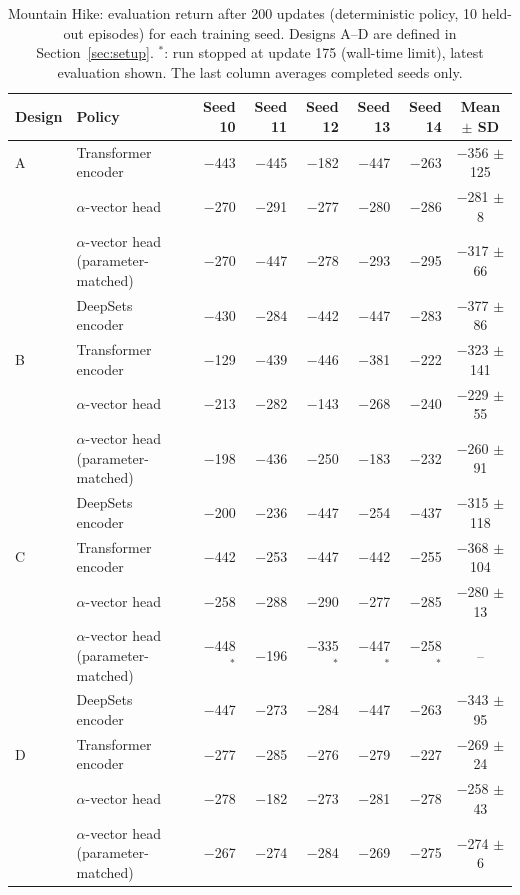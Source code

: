 \documentclass[11pt]{article}
\begin{document}
\begin{table}[htbp]
\centering
\footnotesize
\caption{Mountain Hike: evaluation return after 200 updates (deterministic policy, 10 held-out episodes) for each training seed. Designs A--D are defined in Section~\ref{sec:setup}. $^{*}$: run stopped at update 175 (wall-time limit), latest evaluation shown. The last column averages completed seeds only.}
\label{tab:mh-final}
\begin{tabular}{llrrrrrc}
\toprule
Design & Policy & Seed 10 & Seed 11 & Seed 12 & Seed 13 & Seed 14 & Mean $\pm$ SD \\
\midrule
A & Transformer encoder & $-$443 & $-$445 & $-$182 & $-$447 & $-$263 & $-$356 $\pm$ 125 \\
 & $\alpha$-vector head & $-$270 & $-$291 & $-$277 & $-$280 & $-$286 & $-$281 $\pm$ 8 \\
 & $\alpha$-vector head (parameter-matched) & $-$270 & $-$447 & $-$278 & $-$293 & $-$295 & $-$317 $\pm$ 66 \\
 & DeepSets encoder & $-$430 & $-$284 & $-$442 & $-$447 & $-$283 & $-$377 $\pm$ 86 \\
\midrule
B & Transformer encoder & $-$129 & $-$439 & $-$446 & $-$381 & $-$222 & $-$323 $\pm$ 141 \\
 & $\alpha$-vector head & $-$213 & $-$282 & $-$143 & $-$268 & $-$240 & $-$229 $\pm$ 55 \\
 & $\alpha$-vector head (parameter-matched) & $-$198 & $-$436 & $-$250 & $-$183 & $-$232 & $-$260 $\pm$ 91 \\
 & DeepSets encoder & $-$200 & $-$236 & $-$447 & $-$254 & $-$437 & $-$315 $\pm$ 118 \\
\midrule
C & Transformer encoder & $-$442 & $-$253 & $-$447 & $-$442 & $-$255 & $-$368 $\pm$ 104 \\
 & $\alpha$-vector head & $-$258 & $-$288 & $-$290 & $-$277 & $-$285 & $-$280 $\pm$ 13 \\
 & $\alpha$-vector head (parameter-matched) & $-$448$^{*}$ & $-$196 & $-$335$^{*}$ & $-$447$^{*}$ & $-$258$^{*}$ & -- \\
 & DeepSets encoder & $-$447 & $-$273 & $-$284 & $-$447 & $-$263 & $-$343 $\pm$ 95 \\
\midrule
D & Transformer encoder & $-$277 & $-$285 & $-$276 & $-$279 & $-$227 & $-$269 $\pm$ 24 \\
 & $\alpha$-vector head & $-$278 & $-$182 & $-$273 & $-$281 & $-$278 & $-$258 $\pm$ 43 \\
 & $\alpha$-vector head (parameter-matched) & $-$267 & $-$274 & $-$284 & $-$269 & $-$275 & $-$274 $\pm$ 6 \\

\end{tabular}
\end{table}
\end{document}
